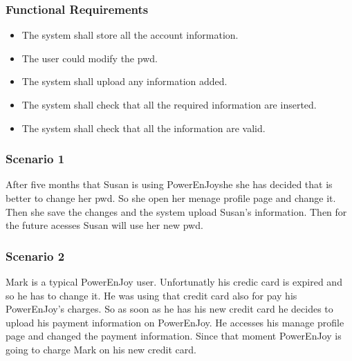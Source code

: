 \subsubsection{Functional Requirements}
\begin{itemize}
  \item The system shall store all the account information.
  \item The user could modify the \gls{pwd}.
  \item The system shall upload any information added.
  \item The system shall check that all the required information are inserted.
  \item The system shall check that all the information are valid.
\end{itemize}

\subsubsection{Scenario 1}
After five months that Susan is using PowerEnJoyshe she has decided that is better to change her \gls{pwd}. So she open her menage profile page and change it. Then she save the changes and the system upload Susan's information. Then for the future acesses Susan will use her new \gls{pwd}.

\subsubsection{Scenario 2}
Mark is a typical PowerEnJoy user. Unfortunatly his credic card is expired and so he has to change it. He was using that credit card also for pay his PowerEnJoy's charges. So as soon as he has his new credit card he decides to upload his payment information on PowerEnJoy. He accesses his manage profile page and changed the payment information. Since that moment PowerEnJoy is going to charge Mark on his new credit card.





